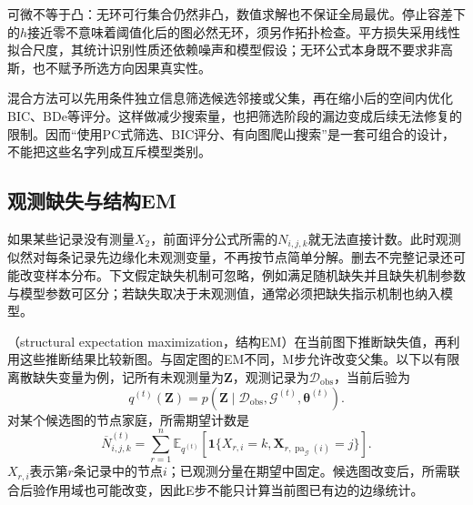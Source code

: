 可微不等于凸：无环可行集合仍然非凸，数值求解也不保证全局最优。停止容差下的$h$接近零不意味着阈值化后的图必然无环，须另作拓扑检查。平方损失采用线性拟合尺度，其统计识别性质还依赖噪声和模型假设；无环公式本身既不要求非高斯，也不赋予所选方向因果真实性。

混合方法可以先用条件独立信息筛选候选邻接或父集，再在缩小后的空间内优化BIC、BDe等评分。这样做减少搜索量，也把筛选阶段的漏边变成后续无法修复的限制。因而“使用PC式筛选、BIC评分、有向图爬山搜索”是一套可组合的设计，不能把这些名字列成互斥模型类别。

\subsection{观测缺失与结构EM}
\label{sec:pgm-structure-learning-structural-em}

如果某些记录没有测量$X_2$，前面评分公式所需的$N_{i,j,k}$就无法直接计数。此时观测似然对每条记录先边缘化未观测变量，不再按节点简单分解。删去不完整记录还可能改变样本分布。下文假定缺失机制可忽略，例如满足随机缺失并且缺失机制参数与模型参数可区分；若缺失取决于未观测值，通常必须把缺失指示机制也纳入模型。

（structural expectation maximization，结构EM）在当前图下推断缺失值，再利用这些推断结果比较新图。与固定图的EM不同，M步允许改变父集。以下以有限离散缺失变量为例，记所有未观测量为$\bm{Z}$，观测记录为$\mathcal{D}_{\mathrm{obs}}$，当前后验为
\[
  q^{(t)}(\bm{Z})
  =p(\bm{Z}\mid\mathcal{D}_{\mathrm{obs}},
                  \mathcal{G}^{(t)},\bm{\theta}^{(t)}).
\]
对某个候选图的节点家庭，所需期望计数是
\[
  \overline N_{i,j,k}^{(t)}
  =\sum_{r=1}^{n}
    \mathbb{E}_{q^{(t)}}\!
      \left[\mathbf{1}\{X_{r,i}=k,
        \bm{X}_{r,\operatorname{pa}_{\mathcal{G}}(i)}=j\}\right].
\]
$X_{r,i}$表示第$r$条记录中的节点$i$；已观测分量在期望中固定。候选图改变后，所需联合后验作用域也可能改变，因此E步不能只计算当前图已有边的边缘统计。

